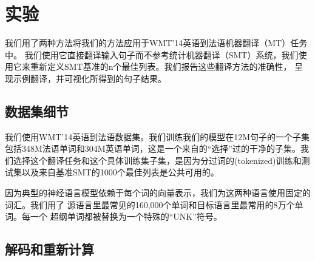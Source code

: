 \section{实验}
\label{sec:experiments}
 
我们用了两种方法将我们的方法应用于WMT'14英语到法语机器翻译（MT）任务中。 我们使用它直接翻译输入句子而不参考统计机器翻译（SMT）系统，我们使用它来重新定义SMT基准的n个最佳列表。我们报告这些翻译方法的准确性，
呈现示例翻译，并可视化所得到的句子结果。

\subsection{数据集细节}

我们使用WMT'14英语到法语数据集。我们训练我们的模型在12M句子的一个子集包括348M法语单词和304M英语单词，这是一个来自\cite{wmt14_en_fr}的“选择”过的干净的子集。我们选择这个翻译任务和这个具体训练集子集，是因为分过词的(tokenized)训练和测试集以及来自基准SMT的1000个最佳列表是公共可用的\cite{wmt14_en_fr}。

因为典型的神经语言模型依赖于每个词的向量表示，我们为这两种语言使用固定的词汇。我们用了
源语言里最常见的160,000个单词和目标语言里最常用的8万个单词。每一个
超纲单词都被替换为一个特殊的“UNK”符号。  
 




\subsection{解码和重新计算}

